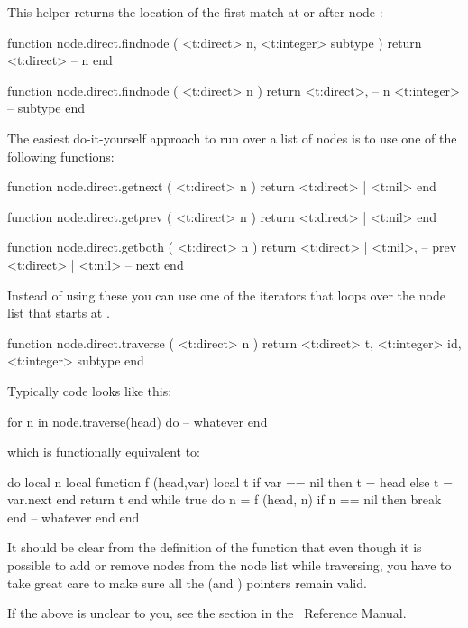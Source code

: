 This helper returns the location of the first match at or after node :

\starttyping[option=LUA]
function node.direct.findnode ( <t:direct> n, <t:integer> subtype )
    return <t:direct> -- n
end

function node.direct.findnode ( <t:direct> n )
    return
        <t:direct>, -- n
        <t:integer> -- subtype
end
\stoptyping

\stopsubsection

\startsubsection[title={Traversing}]

The easiest do-it-yourself approach to run over a list of nodes is to use one of
the following functions:

\starttyping[option=LUA]
function node.direct.getnext ( <t:direct> n )
    return <t:direct> | <t:nil>
end

function node.direct.getprev ( <t:direct> n )
    return <t:direct> | <t:nil>
end

function node.direct.getboth ( <t:direct> n )
    return
        <t:direct> | <t:nil>, -- prev
        <t:direct> | <t:nil>  -- next
end
\stoptyping

Instead of using these you can use one of the iterators that loops over the node
list that starts at .

\starttyping[option=LUA]
function node.direct.traverse ( <t:direct> n )
    return
        <t:direct>  t,
        <t:integer> id,
        <t:integer> subtype
end
\stoptyping

Typically code looks like this:

\starttyping[option=LUA]
for n in node.traverse(head) do
    -- whatever
end
\stoptyping

which is functionally equivalent to:

\starttyping[option=LUA]
do
    local n
    local function f (head,var)
        local t
        if var == nil then
            t = head
        else
            t = var.next
        end
        return t
    end
    while true do
        n = f (head, n)
        if n == nil then
            break
        end
        -- whatever
    end
end
\stoptyping

It should be clear from the definition of the function  that even though
it is possible to add or remove nodes from the node list while traversing, you
have to take great care to make sure all the  (and )
pointers remain valid.

If the above is unclear to you, see the section  in the
\LUA\ Reference Manual.

